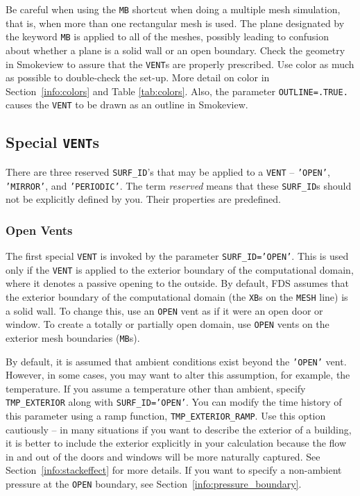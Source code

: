 \documentclass[11pt]{book}
\newcommand{\ct}{\tt\small}
\begin{document}
Be careful when using the {\ct MB} shortcut when doing a multiple mesh
simulation, that is, when more than one rectangular mesh is used. The
plane designated by the keyword {\ct MB} is applied to all of the
meshes, possibly leading to confusion about whether a plane is a solid
wall or an open boundary. Check the geometry in Smokeview to assure that
the {\ct VENT}s are properly prescribed. Use color as much as
possible to double-check the set-up.  More detail on color in
Section~\ref{info:colors} and Table \ref{tab:colors}. Also, the parameter {\ct OUTLINE=.TRUE.} causes the
{\ct VENT} to be drawn as an outline in Smokeview.


\subsection{Special \texorpdfstring{{\tt VENT}s}{VENTs}}

\label{info:Special_VENTS}

There are three reserved {\ct SURF\_ID}'s that may be applied to a {\ct VENT} -- {\ct 'OPEN'}, {\ct 'MIRROR'}, and {\ct 'PERIODIC'}. The term {\em reserved} means that these {\ct SURF\_ID}s should not be explicitly defined by you. Their properties are predefined.

\subsubsection{Open Vents}

The first special {\ct VENT} is invoked by the parameter {\ct SURF\_ID='OPEN'}. This is used only if the {\ct VENT} is applied to the exterior boundary of the computational domain, where it denotes a passive opening to the outside. By default, FDS assumes that the exterior boundary of the computational domain (the {\ct XB}s on the {\ct MESH} line) is a solid wall. To change this, use an {\ct OPEN} vent as if it were an open door or window. To create a totally or partially open domain, use {\ct OPEN} vents on the exterior mesh boundaries ({\ct MB}s).

By default, it is assumed that ambient conditions exist beyond the {\ct 'OPEN'} vent. However, in some cases, you may want to alter this assumption, for example, the temperature. If you assume a temperature other than ambient, specify {\ct TMP\_EXTERIOR} along with {\ct SURF\_ID='OPEN'}. You can modify the time history of this parameter using a ramp function, {\ct TMP\_EXTERIOR\_RAMP}. Use this option cautiously -- in many situations if you want to describe the exterior of a building, it is better to include the exterior explicitly in your calculation because the flow in and out of the doors and windows will be more naturally captured. See Section~\ref{info:stackeffect} for more details. If you want to specify a non-ambient pressure at the {\ct OPEN} boundary, see Section~\ref{info:pressure_boundary}.
\end{document}
